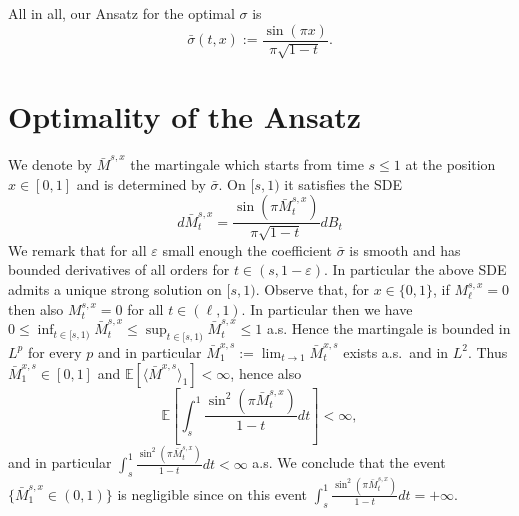 \documentclass[reqno, a4paper]{amsart}
\theoremstyle{remark}
\newcommand{\1}{\mathbbm 1}
\renewcommand{\epsilon}{\varepsilon}
\numberwithin{equation}{section}
\numberwithin{theorem}{section}
\newcommand{\mo}{\bar{M}}
\newcommand{\so}{\bar{\sigma}}
\newcommand{\MB}[1]{{\color{purple}{[MB: #1]}}}
\begin{document}
%
All in all, our Ansatz for the optimal $\sigma$ is
\[\so(t,x):=\frac{\sin(\pi x)}{\pi\sqrt{1-t}}.\]
%


\section{Optimality of the Ansatz}

We denote by $\mo^{s,x}$ the martingale which starts from time $s\leq 1$ at the position $x\in[0,1]$ and is determined by $\so$. On $[s,1)$ it satisfies the SDE
%
\[d\mo^{s,x}_t = \frac{\sin(\pi \mo^{s,x}_t)}{\pi\sqrt{1-t}}dB_t\]
%
We remark that for all $\epsilon$ small enough the coefficient $\so$ is smooth and has bounded derivatives of all orders for $t\in(s,1-\epsilon)$. In particular the above SDE admits a unique strong solution on $[s,1)$. Observe that, for $x\in\{0,1\}$, if $M^{s,x}_\ell = 0$ then also $M^{s,x}_t = 0$ for all $t\in(\ell,1)$. In particular then we have $0\leq\inf_{t\in[s,1)}\mo_t^{s,x}\leq \sup_{t\in[s,1)}\mo_t^{s,x}\leq 1$ a.s. Hence the martingale is bounded in $L^p$ for every $p$ and in particular $\mo^{x,s}_1:= \lim_{t\to 1} \mo^{x,s}_t$ exists a.s.\ and in $L^2$. Thus $\mo^{x,s}_1\in [0,1]$ and  $\mathbb E[\langle \mo^{x,s}\rangle_1]<\infty$, hence also 
$$\mathbb E\left[\int_s^1 \frac{\sin^2(\pi \mo^{s,x}_t)}{1-t}dt \right ]<\infty,$$
and in particular $\int_s^1 \frac{\sin^2(\pi \mo^{s,x}_t)}{1-t}dt <\infty$ a.s. We conclude that the event $\{\mo^{s,x}_1\in (0,1)\}$ is negligible since on this event $\int_s^1 \frac{\sin^2(\pi \mo^{s,x}_t)}{1-t}dt=+\infty$.
\end{document}
